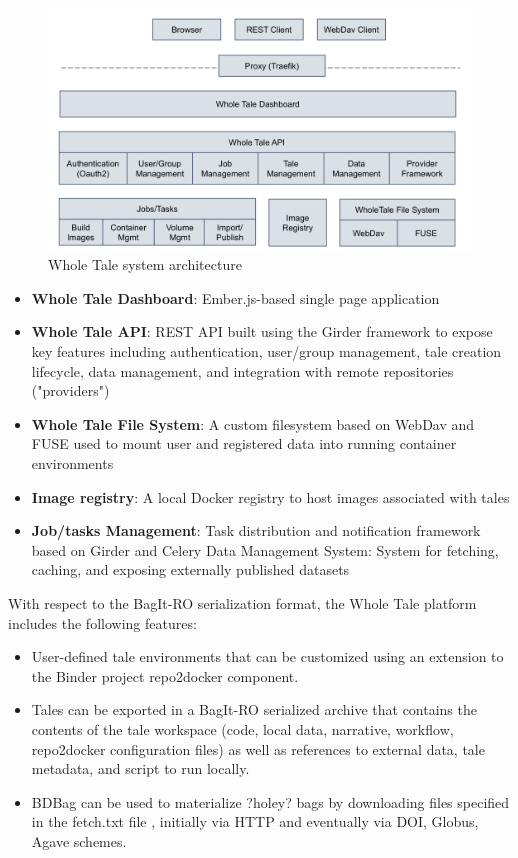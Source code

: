\documentclass[conference]{IEEEtran}
\begin{document}
\begin{figure}
\centering
\includegraphics[scale=0.25]{images/wholetale-architecture.png}
\caption{Whole Tale system architecture}
\end{figure}

\begin{itemize}
\item{{\bf Whole Tale Dashboard}: Ember.js-based single page application}
\item{{\bf Whole Tale API}: REST API built using the Girder framework to expose key features including authentication, user/group management, tale creation lifecycle, data management, and integration with remote repositories ("providers")}
\item{{\bf Whole Tale File System}: A custom filesystem based on WebDav and FUSE used to mount user and registered data into running container environments}
\item{{\bf Image registry}: A local Docker registry to host images associated with tales}
\item{{\bf Job/tasks Management}: Task distribution and notification framework based on Girder and Celery Data Management System: System for fetching, caching, and exposing externally published datasets}
\end{itemize}

With respect to the BagIt-RO serialization format, the Whole Tale platform includes the following features:
\begin{itemize}
\item{User-defined tale environments that can be customized using an extension to the Binder project repo2docker component.}
\item{Tales can be exported in a BagIt-RO serialized archive that contains the contents of the tale workspace (code, local data, narrative, workflow, repo2docker configuration files) as well as references to external data, tale metadata, and script to run locally.}
\item{BDBag \cite{chard2016} can be used to materialize ?holey? bags by downloading files specified in the fetch.txt file , initially via HTTP and eventually via DOI, Globus, Agave schemes.}
\end{itemize}
\end{document}
